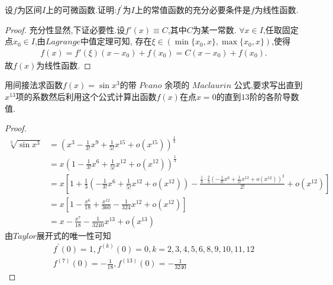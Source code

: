 \documentclass[lang=cn,newtx,10pt,scheme=chinese]{../Template/elegantbook}
\begin{document}
\begin{exercise}
设\(f\)为区间\(I\)上的可微函数.证明:\(f^{\prime}\)为\(I\)上的常值函数的充分必要条件是\(f\)为线性函数.
\end{exercise}
\begin{proof}
充分性显然,下证必要性.设$f'(x)\equiv C$,其中$C$为某一常数.
$\forall x\in I$,任取固定点$x_0\in I$,由$Lagrange$中值定理可知,
存在$\xi\in(\min\{x_0,x\},\max\{x_0,x\})$,使得
\begin{align*}
f(x)=f'(\xi)(x-x_0)+f(x_0)=C(x-x_0)+f(x_0).
\end{align*}
故$f(x)$为线性函数.
\end{proof}

\begin{exercise}
    用间接法求函数\(f(x)=\sin x^3\)的带 $Peano$ 余项的 $Maclaurin$ 公式,要求写出直到\(x^{13}\)项的系数然后利用这个公式计算出函数\(f(x)\)在点\(x = 0\)的直到\(13\)阶的各阶导数值.
    \begin{proof}
        \begin{equation}
            \begin{split}
                \sqrt[3]{\sin x^3}&=\left( x^3-\frac{1}{3!}x^9+\frac{1}{5!}x^{15}+o\left( x^{15} \right) \right) ^{\frac{1}{3}}
\\
&=x\left( 1-\frac{1}{3!}x^6+\frac{1}{5!}x^{12}+o\left( x^{12} \right) \right) ^{\frac{1}{3}}
\\
&=x\left[ 1+\frac{1}{3}\left( -\frac{1}{3!}x^6+\frac{1}{5!}x^{12}+o\left( x^{12} \right) \right) -\frac{\frac{1}{3}\cdot \frac{2}{3}\left( -\frac{1}{3!}x^6+\frac{1}{5!}x^{12}+o\left( x^{12} \right) \right) ^2}{2!}+o\left( x^{12} \right) \right] 
\\
&=x\left[ 1-\frac{x^6}{18}+\frac{x^{12}}{360}-\frac{1}{324}x^{12}+o\left( x^{12} \right) \right]\\
&=x-\frac{x^7}{18}-\frac{1}{3240}x^{13}+o\left( x^{13} \right)
            \end{split}
            \nonumber
        \end{equation}
        由$Taylor$展开式的唯一性可知
        \begin{gather}
            f^{\prime}(0)=1,f^{(k)}(0)=0,k=2,3,4,5,6,8,9,10,11,12\nonumber\\
            f^{(7)}(0)=-\frac{1}{18},f^{(13)}(0)=-\frac{1}{3240}\nonumber
        \end{gather}
    \end{proof}
\end{exercise}
\end{document}

